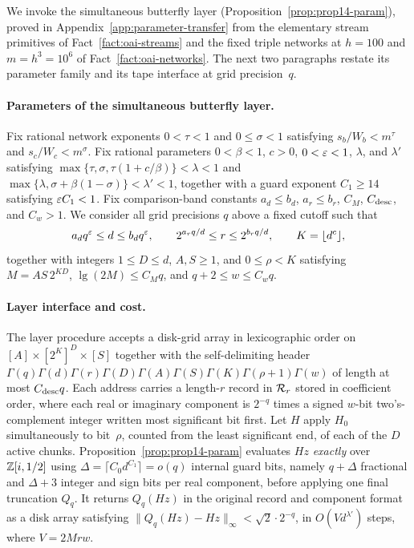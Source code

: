 We invoke the simultaneous butterfly layer (Proposition~\ref{prop:prop14-param}), proved in
Appendix~\ref{app:parameter-transfer} from the elementary stream primitives of Fact~\ref{fact:oai-streams} and the
fixed triple networks at $h=100$ and $m=h^3=10^6$ of Fact~\ref{fact:oai-networks}. The next two paragraphs restate its
parameter family and its tape interface at grid precision~$q$.

\paragraph{Parameters of the simultaneous butterfly layer.}
Fix rational network exponents $0<\tau<1$ and $0\le\sigma<1$ satisfying $s_b/W_b<m^\tau$ and $s_c/W_c<m^\sigma$. Fix
rational parameters $0<\beta<1$, $c>0$, $0<\varepsilon<1$, $\lambda$, and $\lambda'$ satisfying
$\max\{\tau,\sigma,\tau(1+c/\beta)\}<\lambda<1$ and $\max\{\lambda,\sigma+\beta(1-\sigma)\}<\lambda'<1$, together with a
guard exponent $C_1\ge14$ satisfying $\varepsilon C_1<1$. Fix comparison-band constants $a_d\le b_d$, $a_r\le b_r$, $C_M$,
$C_{\rm desc}$, and $C_w>1$. We consider all grid precisions $q$ above a fixed cutoff such that
\[
  a_dq^{\varepsilon}\le d\le b_dq^{\varepsilon},\qquad 2^{a_rq/d}\le r\le 2^{b_rq/d},\qquad K=\lfloor d^c\rfloor,
\]
together with integers $1\le D\le d$, $A,S\ge1$, and $0\le\rho<K$ satisfying $M=AS\,2^{KD}$, $\lg(2M)\le C_Mq$, and
$q+2\le w\le C_wq$.

\paragraph{Layer interface and cost.}
The layer procedure accepts a disk-grid array in lexicographic order on $[A]\times[2^K]^D\times[S]$ together with the
self-delimiting header $\Gamma(q)\Gamma(d)\Gamma(r)\Gamma(D)\Gamma(A)\Gamma(S)\Gamma(K)\Gamma(\rho+1)\Gamma(w)$ of
length at most $C_{\rm desc}q$. Each address carries a length-$r$ record in $\mathcal{R}_r$ stored in coefficient order, where
each real or imaginary component is $2^{-q}$ times a signed $w$-bit two's-complement integer written most significant
bit first. Let $H$ apply $H_0$ simultaneously to bit~$\rho$, counted from the least significant end, of each of the $D$
active chunks. Proposition~\ref{prop:prop14-param} evaluates $Hz$ \emph{exactly} over $\mathbb{Z}[i,1/2]$ using
$\Delta=\lceil C_0d^{C_1}\rceil=o(q)$ internal guard bits, namely $q+\Delta$ fractional and $\Delta+3$ integer and sign
bits per real component, before applying one final truncation $Q_q$. It returns $Q_q(Hz)$ in the original record and
component format as a disk array satisfying $\|Q_q(Hz)-Hz\|_\infty<\sqrt2\cdot2^{-q}$, in $O(Vd^{\lambda'})$ steps,
where $V=2Mrw$.


